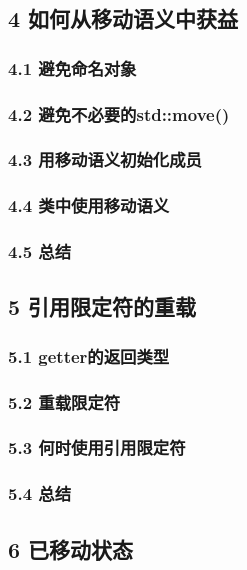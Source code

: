 \documentclass[11pt,a4paper,UTF8]{ctexart}
\begin{document}
	\subsection{4 如何从移动语义中获益}
	
		\subsubsection{4.1 避免命名对象}
		
		\subsubsection{4.2 避免不必要的std::move()}
		
		\subsubsection{4.3 用移动语义初始化成员}
		
		\subsubsection{4.4 类中使用移动语义}
		
		\subsubsection{4.5 总结}
		
	\subsection{5 引用限定符的重载}
	
		\subsubsection{5.1 getter的返回类型}
		
		\subsubsection{5.2 重载限定符}
		
		\subsubsection{5.3 何时使用引用限定符}
		
		\subsubsection{5.4 总结}
		
	\subsection{6 已移动状态}
	
\end{document}
